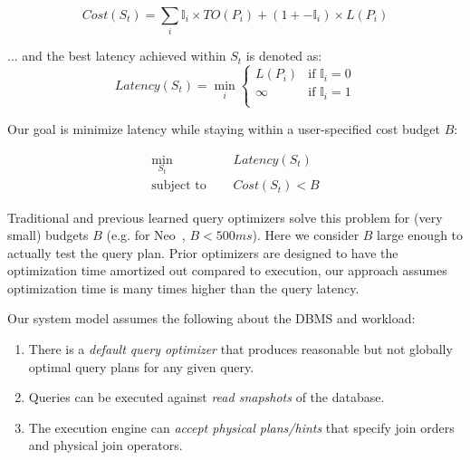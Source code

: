 \begin{equation*}
    Cost(S_t) = \sum_i \mathbb{I}_i \times TO(P_i) + (1 + -\mathbb{I}_i) \times L(P_i)
\end{equation*}

\noindent ... and the best latency achieved within $S_t$ is denoted as:
\begin{equation*}
Latency(S_t) = \min_i 
\begin{cases}
    L(P_i)  & \mbox{if } \mathbb{I}_i = 0 \\
    \infty  & \mbox{if } \mathbb{I}_i = 1 \\ 
\end{cases}
\end{equation*}

\noindent Our goal is minimize latency while staying within a user-specified cost budget $B$:

\begin{equation}
\begin{aligned}
    \min_{S_t} \quad & Latency(S_t) \\
    \mbox{subject to } \quad & Cost(S_t) < B
\end{aligned}
\end{equation}

 Traditional and previous learned query optimizers solve this problem for (very small) budgets $B$ (e.g. for Neo~\cite{neo}, $B < 500ms$). Here we consider $B$ large enough to actually test the query plan. Prior optimizers are designed to have the optimization time amortized out compared to execution, our approach assumes optimization time is many times higher than the query latency.

 Our system model assumes the following about the DBMS and workload:
\begin{enumerate}[leftmargin=*]
    \item There is a \emph{default query optimizer} that produces reasonable but not globally optimal query plans for any given query.
    \item Queries can be executed against \emph{read snapshots} of the database.
    \item The execution engine can \emph{accept physical plans/hints} that specify join orders and physical join operators.
\end{enumerate}

